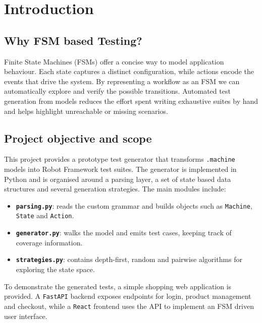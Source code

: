 \section{Introduction}

\subsection{Why FSM based Testing?}
Finite State Machines (FSMs) offer a concise way to model application behaviour. Each state captures a distinct configuration, while actions encode the events that drive the system.  By representing a workflow as an FSM we can automatically explore and verify the possible transitions.  Automated test generation from models reduces the effort spent writing exhaustive suites by hand and helps highlight unreachable or missing scenarios.

\subsection{Project objective and scope}
This project provides a prototype test generator that transforms \texttt{.machine} models into Robot Framework test suites.  The generator is implemented in Python and is organised around a parsing layer, a set of state based data structures and several generation strategies.  The main modules include:
\begin{itemize}
  \item \textbf{\texttt{parsing.py}}: reads the custom grammar and builds objects such as \texttt{Machine}, \texttt{State} and \texttt{Action}.
  \item \textbf{\texttt{generator.py}}: walks the model and emits test cases, keeping track of coverage information.
  \item \textbf{\texttt{strategies.py}}: contains depth-first, random and pairwise algorithms for exploring the state space.
\end{itemize}
To demonstrate the generated tests, a simple shopping web application is provided.  A \texttt{FastAPI} backend exposes endpoints for login, product management and checkout, while a \texttt{React} frontend uses the API to implement an FSM driven user interface.

